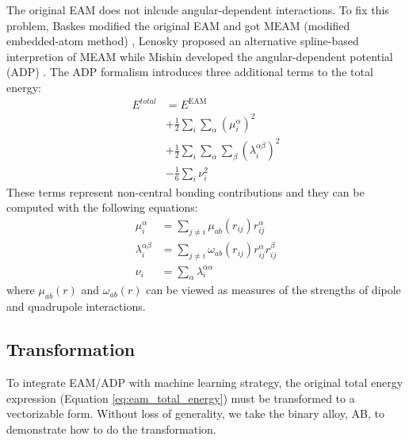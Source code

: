 \documentclass[final,3p,times]{elsarticle}
\begin{document}
The original EAM does not inlcude angular-dependent interactions. To 
fix this problem, Baskes modified the original EAM and got MEAM (modified 
embedded-atom method) \cite{MEAM0}, Lenosky proposed an alternative spline-based 
interpretion of MEAM \cite{MEAM_Lenosky} while Mishin developed the 
angular-dependent potential (ADP) \cite{ADP0,ADP1,ADP2,ADP3,ADP4}. The ADP 
formalism introduces three additional terms to the total energy:
\begin{align}
\label{eq:adp}
E^{total} 
& = E^{\mathrm{EAM}} \nonumber \\
& + \frac{1}{2}\sum_{i}{\sum_{\alpha}{(\mu_{i}^{\alpha})^2}} \nonumber \\
& + \frac{1}{2}\sum_{i}{
    \sum_{\alpha}{\sum_{\beta}{(\lambda_{i}^{\alpha\beta})^2}}} \nonumber \\
& - \frac{1}{6}\sum_{i}{\nu_{i}^{2}}
\end{align}
These terms represent non-central bonding contributions and they can be computed
with the following equations:
\begin{align}
\label{eq:adp_mu}
\mu_{i}^{\alpha} & = \sum_{j \neq i}{\mu_{ab}(r_{ij}) r_{ij}^{\alpha}} \\
\label{eq:adp_lambda}
\lambda_{i}^{\alpha\beta} & = \sum_{j \neq i}{
    \omega_{ab}(r_{ij}) r_{ij}^{\alpha}r_{ij}^{\beta}} \\
\label{eq:adp_nu}
\nu_{i} & = \sum_{\alpha}{\lambda_{i}^{\alpha\alpha}}
\end{align}
where $\mu_{ab}(r)$ and $\omega_{ab}(r)$ can be viewed as measures of the 
strengths of dipole and quadrupole interactions.

\subsection{Transformation}
\label{sec:transformation}

To integrate EAM/ADP with machine learning strategy, the original total energy 
expression (Equation \ref{eq:eam_total_energy}) must be transformed to a 
vectorizable form. Without loss of generality, we take the binary alloy, AB, to 
demonstrate how to do the transformation.

\newcommand{\niaa}{N_{i}^{\mathrm{AA}}}
\newcommand{\niab}{N_{i}^{\mathrm{AB}}}
\newcommand{\njbb}{N_{j}^{\mathrm{BB}}}
\newcommand{\njba}{N_{j}^{\mathrm{BA}}}
\newcommand{\riaa}{\vec{\mathbf{r}}_{i}^{\mathrm{AA}}}
\newcommand{\riab}{\vec{\mathbf{r}}_{i}^{\mathrm{AB}}}
\newcommand{\ribb}{\vec{\mathbf{r}}_{i}^{\mathrm{BB}}}
\newcommand{\riba}{\vec{\mathbf{r}}_{i}^{\mathrm{BA}}}
\newcommand{\namax}{N_{\mathrm{A}}^{\mathrm{max}}}
\newcommand{\nbmax}{N_{\mathrm{B}}^{\mathrm{max}}}
\newcommand{\nnl}{N^{\mathrm{nl}}}
\newcommand{\nnli}{N^{\mathrm{nl}}_i}
\end{document}
